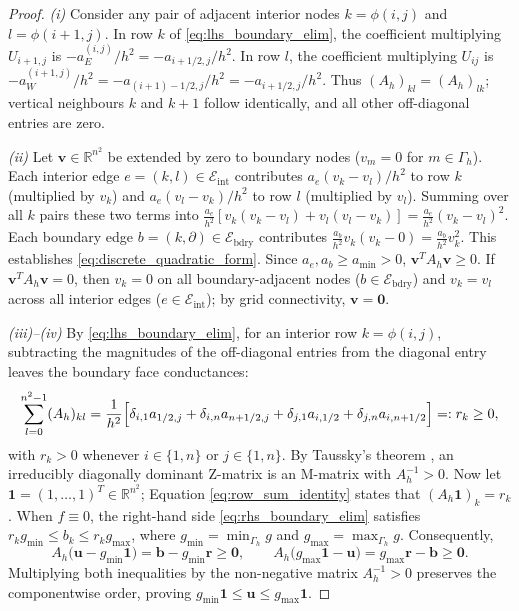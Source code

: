 \documentclass[11pt,a4paper]{article}
\theoremstyle{definition}
\theoremstyle{remark}
\begin{document}
\begin{proof}
\emph{(i)} Consider any pair of adjacent interior nodes $k = \phi(i,j)$ and $l = \phi(i+1,j)$. In row $k$ of \eqref{eq:lhs_boundary_elim}, the coefficient multiplying $U_{i+1,j}$ is $-a_E^{(i,j)}/h^2 = -a_{i+1/2,j}/h^2$. In row $l$, the coefficient multiplying $U_{ij}$ is $-a_W^{(i+1,j)}/h^2 = -a_{(i+1)-1/2,j}/h^2 = -a_{i+1/2,j}/h^2$. Thus $(A_h)_{kl} = (A_h)_{lk}$; vertical neighbours $k$ and $k+1$ follow identically, and all other off-diagonal entries are zero.

\emph{(ii)} Let $\bm{v} \in \mathbb{R}^{n^2}$ be extended by zero to boundary nodes ($v_m = 0$ for $m \in \Gamma_h$). Each interior edge $e = (k,l) \in \mathcal{E}_{\text{int}}$ contributes $a_e(v_k - v_l)/h^2$ to row $k$ (multiplied by $v_k$) and $a_e(v_l - v_k)/h^2$ to row $l$ (multiplied by $v_l$). Summing over all $k$ pairs these two terms into $\frac{a_e}{h^2}[v_k(v_k-v_l) + v_l(v_l-v_k)] = \frac{a_e}{h^2}(v_k - v_l)^2$. Each boundary edge $b = (k,\partial) \in \mathcal{E}_{\text{bdry}}$ contributes $\frac{a_b}{h^2}v_k(v_k - 0) = \frac{a_b}{h^2}v_k^2$. This establishes \eqref{eq:discrete_quadratic_form}. Since $a_e, a_b \ge a_{\min} > 0$, $\bm{v}^T A_h \bm{v} \ge 0$. If $\bm{v}^T A_h \bm{v} = 0$, then $v_k = 0$ on all boundary-adjacent nodes ($b \in \mathcal{E}_{\text{bdry}}$) and $v_k = v_l$ across all interior edges ($e \in \mathcal{E}_{\text{int}}$); by grid connectivity, $\bm{v} = \bm{0}$.

\emph{(iii)--(iv)} By \eqref{eq:lhs_boundary_elim}, for an interior row $k = \phi(i,j)$, subtracting the magnitudes of the off-diagonal entries from the diagonal entry leaves the boundary face conductances:
\begin{equation}
    \sum_{l=0}^{n^2-1} (A_h)_{kl} = \frac{1}{h^2}\Bigl[ \delta_{i,1}a_{1/2,j} + \delta_{i,n}a_{n+1/2,j} + \delta_{j,1}a_{i,1/2} + \delta_{j,n}a_{i,n+1/2} \Bigr] =: r_k \ge 0,
    \label{eq:row_sum_identity}
\end{equation}
with $r_k > 0$ whenever $i \in \{1,n\}$ or $j \in \{1,n\}$. By Taussky's theorem \cite{hackbusch2017}, an irreducibly diagonally dominant Z-matrix is an M-matrix with $A_h^{-1} > 0$. Now let $\bm{1} = (1,\dots,1)^T \in \mathbb{R}^{n^2}$; Equation \eqref{eq:row_sum_identity} states that $(A_h \bm{1})_k = r_k$. When $f \equiv 0$, the right-hand side \eqref{eq:rhs_boundary_elim} satisfies $r_k g_{\min} \le b_k \le r_k g_{\max}$, where $g_{\min} = \min_{\Gamma_h} g$ and $g_{\max} = \max_{\Gamma_h} g$. Consequently,
\[
    A_h\bigl(\bm{u} - g_{\min}\bm{1}\bigr) = \bm{b} - g_{\min}\bm{r} \ge \bm{0}, \qquad
    A_h\bigl(g_{\max}\bm{1} - \bm{u}\bigr) = g_{\max}\bm{r} - \bm{b} \ge \bm{0}.
\]
Multiplying both inequalities by the non-negative matrix $A_h^{-1} > 0$ preserves the componentwise order, proving $g_{\min}\bm{1} \le \bm{u} \le g_{\max}\bm{1}$.
\end{proof}
\end{document}
